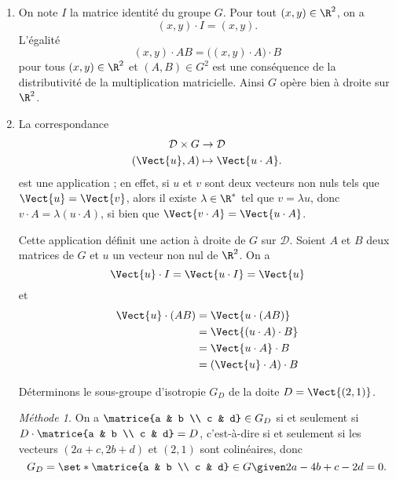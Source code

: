 \begin{enumerate}
  \item
    On note $I$ la matrice identité du groupe $G$.
    Pour tout $(x, y)\in\R^2$, on a
    \[
      (x, y)\cdot I = (x, y).
    \]
    L'égalité
    \[
      (x, y)\cdot AB = \bigl((x, y)\cdot A\bigr)\cdot B
    \]
    pour tous $(x, y)\in\R^2$ et $(A, B)\in G^2$ est une conséquence de la distributivité de la multiplication matricielle.
    Ainsi $G$ opère bien à droite sur $\R^2$.

  \item
    La correspondance
    \begin{align*}
      \mathcal{D}\times G &\to\mathcal{D} \\
      (\Vect{u}, A) &\mapsto \Vect{u\cdot A}.
    \end{align*}
     est une application ; en effet, si $u$ et $v$ sont deux vecteurs non nuls tels que $\Vect{u} = \Vect{v}$, alors il existe $\lambda\in\R^*$ tel que $v = \lambda u$, donc $v\cdot A = \lambda (u\cdot A)$, si bien que $\Vect{v\cdot A} = \Vect{u\cdot A}$.

    Cette application définit une action à droite de $G$ sur $\mathcal{D}$.
    Soient $A$ et $B$ deux matrices de $G$ et $u$ un vecteur non nul de $\R^2$.
    On a
    \[
      \Vect{u}\cdot I = \Vect{u\cdot I} = \Vect{u}
    \]
    et
    \begin{align*}
      \Vect{u}\cdot (AB)
        &= \Vect{u\cdot (AB)} \\
        &= \Vect{(u\cdot A)\cdot B} \\
        &= \Vect{u\cdot A}\cdot B \\
        &= (\Vect{u}\cdot A)\cdot B
    \end{align*}

    Déterminons le sous-groupe d'isotropie $G_D$ de la doite $D = \Vect{(2,1)}$.

    \emph{Méthode 1.}
    On a $\matrice{a & b \\ c & d}\in G_D$ si et seulement si $D\cdot\matrice{a & b \\ c & d} = D$, c'est-à-dire si et seulement si les vecteurs $(2a + c, 2b + d)$ et $(2, 1)$ sont colinéaires, donc
    \[
      G_D = \set*{\matrice{a & b \\ c & d}\in G \given 2a - 4b  + c - 2d = 0}.
    \]


\end{enumerate}
